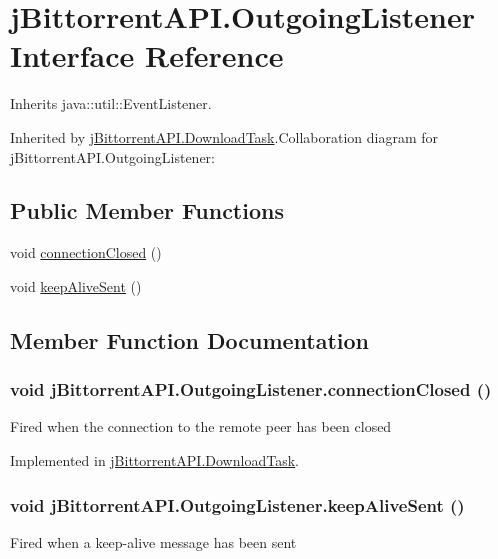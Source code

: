 \hypertarget{interfacej_bittorrent_a_p_i_1_1_outgoing_listener}{
\section{jBittorrentAPI.OutgoingListener Interface Reference}
\label{interfacej_bittorrent_a_p_i_1_1_outgoing_listener}
}


Inherits java::util::EventListener.

Inherited by \hyperlink{classj_bittorrent_a_p_i_1_1_download_task}{jBittorrentAPI.DownloadTask}.Collaboration diagram for jBittorrentAPI.OutgoingListener:\subsection*{Public Member Functions}
\begin{DoxyCompactItemize}
\item 
void \hyperlink{interfacej_bittorrent_a_p_i_1_1_outgoing_listener_aede38edb5347290c7c7a234de14f208e}{connectionClosed} ()
\item 
void \hyperlink{interfacej_bittorrent_a_p_i_1_1_outgoing_listener_a21390243ebe1a22870106a42fa4f6d04}{keepAliveSent} ()
\end{DoxyCompactItemize}


\subsection{Member Function Documentation}
\hypertarget{interfacej_bittorrent_a_p_i_1_1_outgoing_listener_aede38edb5347290c7c7a234de14f208e}{
\subsubsection[{connectionClosed}]{\setlength{\rightskip}{0pt plus 5cm}void jBittorrentAPI.OutgoingListener.connectionClosed ()}}
\label{interfacej_bittorrent_a_p_i_1_1_outgoing_listener_aede38edb5347290c7c7a234de14f208e}
Fired when the connection to the remote peer has been closed 

Implemented in \hyperlink{classj_bittorrent_a_p_i_1_1_download_task_aee45e53d98af60717f41840bc5e44c73}{jBittorrentAPI.DownloadTask}.\hypertarget{interfacej_bittorrent_a_p_i_1_1_outgoing_listener_a21390243ebe1a22870106a42fa4f6d04}{
\subsubsection[{keepAliveSent}]{\setlength{\rightskip}{0pt plus 5cm}void jBittorrentAPI.OutgoingListener.keepAliveSent ()}}
\label{interfacej_bittorrent_a_p_i_1_1_outgoing_listener_a21390243ebe1a22870106a42fa4f6d04}
Fired when a keep-\/alive message has been sent 

